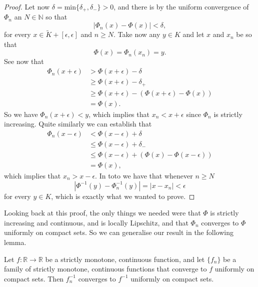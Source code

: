 \documentclass[11pt, a4paper]{article}
\begin{document}
\begin{appendix}
\begin{proof}
Let now $\delta = \mathrm{min}\{\delta_+, \delta_- \}>0$, and there is by the uniform convergence of $\Phi_n$ an $N \in \mathbb{N}$ so that
\begin{equation*}
|\Phi_n(x) - \Phi(x)| < \delta,
\end{equation*}
for every $x \in \tilde{K}+[\epsilon, \epsilon]$ and $n \geq N$. Take now any $y \in K$ and let $x$ and $x_n$ be so that
\begin{equation*}
\Phi(x) = \Phi_n(x_n) = y.
\end{equation*}
See now that
\begin{align*}
\Phi_n(x+\epsilon) &> \Phi(x+\epsilon) -\delta \\
&\geq    \Phi(x+\epsilon) -\delta_+ \\
&\geq \Phi(x+\epsilon) - (\Phi(x+\epsilon) - \Phi(x)) \\
&= \Phi(x).
\end{align*}
So we have $\Phi_n(x+\epsilon) < y$, which implies that $x_n < x+\epsilon$ since $\Phi_n$ is strictly increasing. Quite similarly we can establish that
\begin{align*}
\Phi_n(x-\epsilon) &< \Phi(x-\epsilon) + \delta \\
&\leq \Phi(x-\epsilon) + \delta_- \\
&\leq \Phi(x-\epsilon) + (\Phi(x) - \Phi(x-\epsilon)) \\
&= \Phi(x),
\end{align*}
which implies that $x_n > x-\epsilon$. In toto we have that whenever $n\geq N$
\begin{equation*}
|\Phi^{-1}(y) - \Phi_n^{-1}(y)| = |x - x_n| < \epsilon
\end{equation*}
for every $y \in K$, which is exactly what we wanted to prove.
\end{proof}

Looking back at this proof, the only things we needed were that $\Phi$ is strictly increasing and continuous, and is locally Lipschitz, and that $\Phi_n$ converges to $\Phi$ uniformly on compact sets. So we can generalise our result in the following lemma.

\begin{lemma}
\label{lem:Inverse_uniform_general}
Let $f: \mathbb{R} \to \mathbb{R}$ be a strictly monotone, continuous function, and let $\{f_n\}$ be a family of strictly monotone, continuous functions that converge to $f$ uniformly on compact sets. Then $f_n^{-1}$ converges to $f^{-1}$ uniformly on compact sets.
\end{lemma}


\end{appendix}
\end{document}
